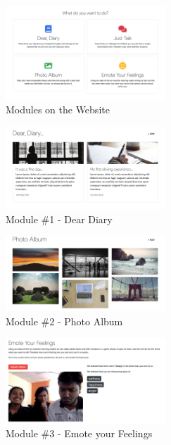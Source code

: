 \documentclass[conference,compsoc]{IEEEtran}
\begin{document}
\begin{figure}[H]
    \centering
    \includegraphics[width=6cm]{images/screenshots/website/website-modules.png}
    \caption{Modules on the Website}
\end{figure}

\begin{figure}[H]
    \centering
    \includegraphics[width=6cm]{images/screenshots/website/website-dear-diary.png}
    \caption{Module \#1 - Dear Diary}
\end{figure}

\begin{figure}[H]
    \centering
    \includegraphics[width=6cm]{images/screenshots/website/website-photo-album.png}
    \caption{Module \#2 - Photo Album}
\end{figure}

\begin{figure}[H]
    \centering
    \includegraphics[width=6cm]{images/screenshots/website/website-emote-feelings.png}
    \caption{Module \#3 - Emote your Feelings}
\end{figure}

\end{document}
